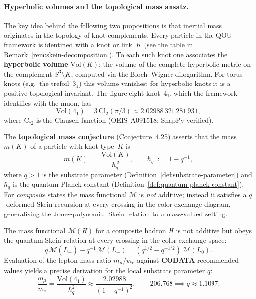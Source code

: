 \paragraph{Hyperbolic volumes and the topological mass ansatz.}
The key idea behind the following two propositions is that inertial mass
originates in the topology of knot complements.  Every particle in the QOU
framework is identified with a knot or link~$K$ (see the table in
Remark~\ref{rem:skein-decomposition}).  To each such knot one associates the
\textbf{hyperbolic volume} $\mathrm{Vol}(K)$: the volume of the complete
hyperbolic metric on the complement $S^3 \setminus K$, computed via the
Bloch--Wigner dilogarithm.  For torus knots (e.g.\ the trefoil~$3_1$) this
volume vanishes; for hyperbolic knots it is a positive topological invariant.
The figure-eight knot~$4_1$, which the framework identifies with the muon,
has
\[
  \mathrm{Vol}(4_1) = 3\,\mathrm{Cl}_2(\pi/3)
    \approx 2.02988\,321\,281\,931,
\]
where $\mathrm{Cl}_2$ is the Clausen function (OEIS~A091518; SnapPy-verified).

The \textbf{topological mass conjecture} (Conjecture~4.25) asserts that the
mass $m(K)$ of a particle with knot type~$K$ is
\[
  m(K) \;=\; \frac{\mathrm{Vol}(K)}{\hbar_q^{\,2}},
  \qquad
  \hbar_q \;:=\; 1 - q^{-1},
\]
where $q > 1$ is the substrate parameter
(Definition~\ref{def:substrate-parameter}) and $\hbar_q$ is the quantum
Planck constant (Definition~\ref{def:quantum-planck-constant}).  For
\emph{composite} states the mass functional $\mathcal{M}$ is \emph{not}
additive; instead it satisfies a $q$-deformed Skein recursion at every
crossing in the color-exchange diagram, generalising the Jones-polynomial
Skein relation to a mass-valued setting.

\begin{proposition}
\label{prop:skein-mass-relation}
\leanok
The mass functional $\mathcal{M}(H)$ for a composite hadron $H$ is not additive but obeys the quantum Skein relation at every crossing in the color-exchange space:
$$q \,\mathcal{M}(L_+) - q^{-1}\,\mathcal{M}(L_-) = (q^{1/2} - q^{-1/2})\,\mathcal{M}(L_0).$$
Evaluation of the lepton mass ratio $m_{\mu}/m_{e}$ against \textbf{CODATA} recommended values yields a precise derivation for the local substrate parameter $q$:
$$
\frac{m_{\mu}}{m_{e}} = \frac{\mathrm{Vol}(4_1)}{\hbar_q^2}
  \approx \frac{2.02988}{(1 - q^{-1})^2},
\qquad 206.768 \implies q \approx 1.1097.
$$
\end{proposition}

